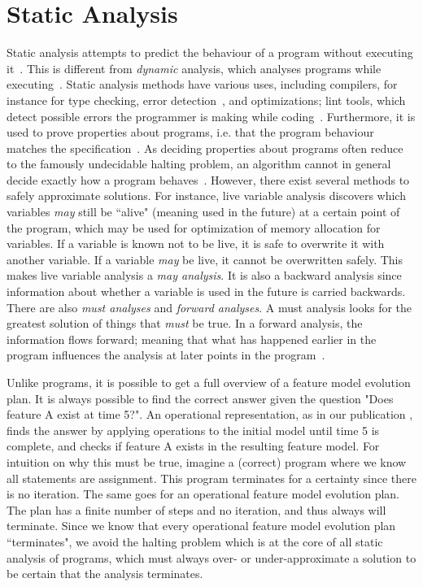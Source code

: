 \section{Static Analysis}
\label{sec:static-analysis}

Static analysis attempts to predict the behaviour of a program without executing it~\cite{book:principles-of-program-analysis}. This is different from \emph{dynamic} analysis, which analyses programs while executing~\cite{art:a-survey-on-static-analysis-and-model-checking}. Static analysis methods have various uses, including compilers, for instance for type checking, error detection~\cite{art:a-survey-on-automated-dynamic-malware-analysis-techniques-and-tools}, and optimizations; lint tools, which detect possible errors the programmer is making while coding~\cite{art:industrial-perspective-on-static-analysis}. Furthermore, it is used to prove properties about programs, i.e. that the program behaviour matches the specification~\cite{art:a-survey-on-static-analysis-and-model-checking}. As deciding properties about programs often reduce to the famously undecidable halting problem, an algorithm cannot in general decide exactly how a program behaves~\cite{book:principles-of-program-analysis}. However, there exist several methods to safely approximate solutions. For instance, live variable analysis discovers which variables \emph{may} still be ``alive" (meaning used in the future) at a certain point of the program, which may be used for optimization of memory allocation for variables. If a variable is known not to be live, it is safe to overwrite it with another variable. If a variable \emph{may} be live, it cannot be overwritten safely. This makes live variable analysis a \emph{may analysis}. It is also a backward analysis since information about whether a variable is used in the future is carried backwards. There are also \emph{must analyses} and \emph{forward analyses}. A must analysis looks for the greatest solution of things that \emph{must} be true. In a forward analysis, the information flows forward; meaning that what has happened earlier in the program influences the analysis at later points in the program~\cite{book:principles-of-program-analysis}.

Unlike programs, it is possible to get a full overview of a feature model evolution plan. It is always possible to find the correct answer given the question "Does feature A exist at time 5?". An operational representation, as in our publication \cite{art:consistency-preserving-evolution-planning}, finds the answer by applying operations to the initial model until time 5 is complete, and checks if feature A exists in the resulting feature model. For intuition on why this must be true, imagine a (correct) program where we know all statements are assignment. This program terminates for a certainty since there is no iteration. The same goes for an operational feature model evolution plan. The plan has a finite number of steps and no iteration, and thus always will terminate. Since we know that every operational feature model evolution plan ``terminates", we avoid the halting problem which is at the core of all static analysis of programs, which must always over- or under-approximate a solution to be certain that the analysis terminates.

